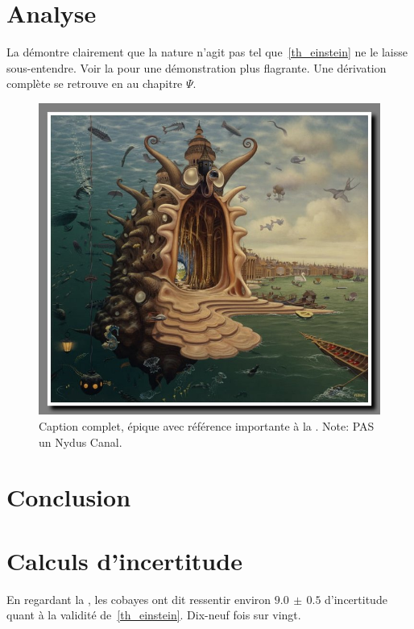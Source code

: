 \documentclass[letterpaper,12pt]{article} %
\begin{document}



\section{Analyse}
La  démontre clairement que la nature n'agit pas tel que~\eqref{th_einstein} ne le laisse sous-entendre. Voir la  pour une démonstration plus flagrante. Une dérivation complète se retrouve en \cite{keyPertinent} au chapitre $\Psi$. 



\begin{figure}[h!]
\begin{center}
\includegraphics[width=\linewidth]{Images/image2.jpg}
\caption{\label{an_SeriouslyWhat?} Caption complet, épique avec référence importante à la . Note: PAS un Nydus Canal. \cite{keyPertinent}}
\end{center}
\end{figure}



\section{Conclusion}





\appendix
\section{Calculs d'incertitude}
En regardant la , les cobayes ont dit ressentir environ $9.0\,\pm\,0.5$ d'incertitude quant à la validité de~\eqref{th_einstein}. Dix-neuf fois sur vingt.
\end{document}

